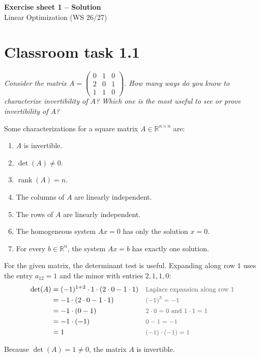 \documentclass[a4paper,11pt]{article}
\newif\ifexplain
\newcommand{\blatttitel}[2]{\begin{center}{\Large\bfseries #1}\\[2pt]#2\end{center}}
\newcommand{\aufgabe}[1]{\section*{#1}}
\newcommand{\angabe}[1]{\textit{#1}\par\smallskip}
\newcommand{\why}[1]{\text{\small\color{black!65}#1}}
\newcommand{\explain}[1]{\ifexplain\begin{erklbox}#1\end{erklbox}\fi}
\begin{document}
\blatttitel{Exercise sheet 1 -- \ifexplain Explanation\else Solution\fi}{Linear Optimization (WS 26/27)}

\explain{Dieses Blatt fragt noch nicht nach dem Lösen von Optimierungsproblemen. Es geht darum, Begriffe aus der Vorlesung sicher wiederzugeben und reale Texte in mathematische Modelle mit Variablen, Zielfunktion und Nebenbedingungen zu übersetzen.}

\aufgabe{Classroom task 1.1}
\angabe{Consider the matrix $A=\begin{pmatrix}0&1&0\\2&0&1\\1&1&0\end{pmatrix}$. How many ways do you know to characterize invertibility of $A$? Which one is the most useful to see or prove invertibility of $A$?}
\explain{Bei einer quadratischen Matrix kann Invertierbarkeit auf mehrere gleichwertige Arten geprüft werden. Für diese konkrete Matrix ist die Determinante besonders bequem, weil in der ersten Zeile zwei Nullen stehen.}

Some characterizations for a square matrix $A\in\mathbb R^{n\times n}$ are:
\begin{enumerate}[label=\arabic*.]
  \item $A$ is invertible.
  \item $\det(A)\neq 0$.
  \item $\operatorname{rank}(A)=n$.
  \item The columns of $A$ are linearly independent.
  \item The rows of $A$ are linearly independent.
  \item The homogeneous system $Ax=0$ has only the solution $x=0$.
  \item For every $b\in\mathbb R^n$, the system $Ax=b$ has exactly one solution.
\end{enumerate}
\explain{Alle Aussagen in der Liste sind für quadratische Matrizen äquivalent. Man darf daher die Aussage wählen, die am wenigsten Rechenaufwand verursacht.}

For the given matrix, the determinant test is useful. Expanding along row $1$ uses the entry $a_{12}=1$ and the minor with entries $2,1,1,0$:
\begin{align*}
\det(A)
&= (-1)^{1+2}\cdot 1\cdot(2\cdot0-1\cdot1) && \why{Laplace expansion along row $1$}\\
&= -1\cdot(2\cdot0-1\cdot1) && \why{$(-1)^{3}=-1$}\\
&= -1\cdot(0-1) && \why{$2\cdot0=0$ and $1\cdot1=1$}\\
&= -1\cdot(-1) && \why{$0-1=-1$}\\
&= 1 && \why{$(-1)\cdot(-1)=1$}
\end{align*}
\explain{Eine Determinante ungleich Null bedeutet: Die Matrix hat vollen Rang, ihre Spalten sind unabhängig, und eine inverse Matrix existiert.}
Because $\det(A)=1\neq0$, the matrix $A$ is invertible.
\end{document}
